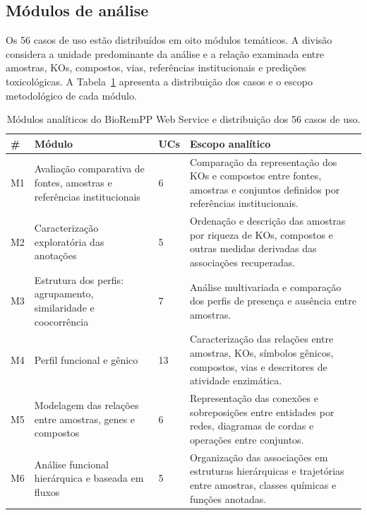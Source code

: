 \subsection{Módulos de análise}

Os 56 casos de uso estão distribuídos em oito módulos temáticos. A divisão
considera a unidade predominante da análise e a relação examinada entre
amostras, KOs, compostos, vias, referências institucionais e predições
toxicológicas. A Tabela~\ref{tab:c3-modulos} apresenta a distribuição dos casos
e o escopo metodológico de cada módulo.

\begin{table}[htbp]
\centering
\caption{Módulos analíticos do BioRemPP Web Service e distribuição dos
56 casos de uso.}
\label{tab:c3-modulos}
\small
\begin{tabularx}{\textwidth}{
    @{}
    p{0.75cm}
    p{4.7cm}
    p{0.9cm}
    X
    @{}
}
\toprule
\textbf{\#}
& \textbf{Módulo}
& \textbf{UCs}
& \textbf{Escopo analítico} \\
\midrule

M1
& Avaliação comparativa de fontes, amostras e referências institucionais
& 6
& Comparação da representação dos KOs e compostos entre fontes, amostras e
conjuntos definidos por referências institucionais. \\

M2
& Caracterização exploratória das anotações
& 5
& Ordenação e descrição das amostras por riqueza de KOs, compostos e outras
medidas derivadas das associações recuperadas. \\

M3
& Estrutura dos perfis: agrupamento, similaridade e coocorrência
& 7
& Análise multivariada e comparação dos perfis de presença e ausência entre
amostras. \\

M4
& Perfil funcional e gênico
& 13
& Caracterização das relações entre amostras, KOs, símbolos gênicos,
compostos, vias e descritores de atividade enzimática. \\

M5
& Modelagem das relações entre amostras, genes e compostos
& 6
& Representação das conexões e sobreposições entre entidades por redes,
diagramas de cordas e operações entre conjuntos. \\

M6
& Análise funcional hierárquica e baseada em fluxos
& 5
& Organização das associações em estruturas hierárquicas e trajetórias entre
amostras, classes químicas e funções anotadas. \\


\end{tabularx}
\end{table}

